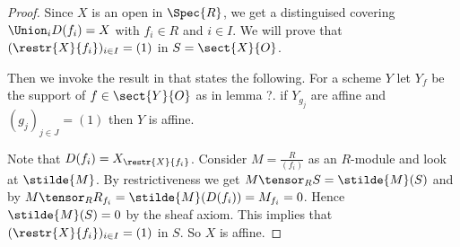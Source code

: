 \begin{proof}
Since $X$ is an open in $\Spec{R}$, 
we get a distinguised covering $\Union_i D(f_i) = X$ with $f_i\in R$
and $i\in I$.
We will prove that $(\restr{X}{f_i})_{i\in I} = (1)$ in $S = \sect{X}{O}$.

Then we invoke the result in \cite[Ex. 2.1.7]{harts} that states the following.
For a scheme $Y$ let $Y_f$  be the support of $f\in \sect{Y}{O}$ as in lemma ?.
if $Y_{g_j}$ are affine and $(g_j)_{j\in J}=(1)$
then $Y$ is affine.

Note that $D(f_i) = X_{\restr{X}{f_i}}$.
Consider $M = \frac{R}{(f_i)}$ as an $R$-module and look at $\stilde{M}$.
By restrictiveness we get $M \tensor_R S = \stilde{M}(S)$ and  
by $M \tensor_R R_{f_i} = \stilde{M}(D(f_i)) = M_{f_i} = 0$. 
Hence $\stilde{M}(S) = 0$ by the sheaf axiom.
This implies that $(\restr{X}{f_i})_{i\in I} = (1)$ in $S$.
So $X$ is affine.
\end{proof}